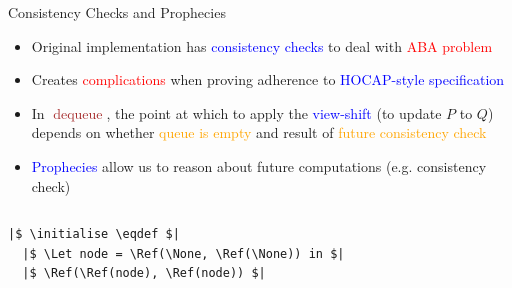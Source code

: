 \documentclass[9pt,xcolor={dvipsnames}]{beamer}
\newcommand{\initialise}{\operatorname{initialize}}
\newcommand{\dequeue}{\operatorname{dequeue}}
\begin{document}
\begin{frame}[fragile]{Consistency Checks and Prophecies}
  \begin{itemize}
    \item Original implementation has \textcolor{blue}{consistency checks} to deal with \textcolor{red}{ABA problem}
    \item Creates \textcolor{red}{complications} when proving adherence to \textcolor{blue}{HOCAP-style specification}
    \item In \textcolor{brown}{$\dequeue$}, the point at which to apply the \textcolor{blue}{view-shift} (to update \textcolor{RubineRed}{$P$} to \textcolor{RubineRed}{$Q$}) depends on whether \textcolor{orange}{queue is empty} and result of \textcolor{orange}{future consistency check}
    \item \textcolor{blue}{Prophecies} allow us to reason about future computations (e.g. \textcolor{ExampleColour}{consistency check})
  \end{itemize}
  \vspace{-12pt}
  \begin{columns}
    \begin{column}{0.5\textwidth}
      \begin{verbatim}
|$ \initialise \eqdef $|
  |$ \Let node = \Ref(\None, \Ref(\None)) in $|
  |$ \Ref(\Ref(node), \Ref(node)) $|


\end{verbatim}
\end{column}
\end{columns}
\end{frame}
\end{document}
